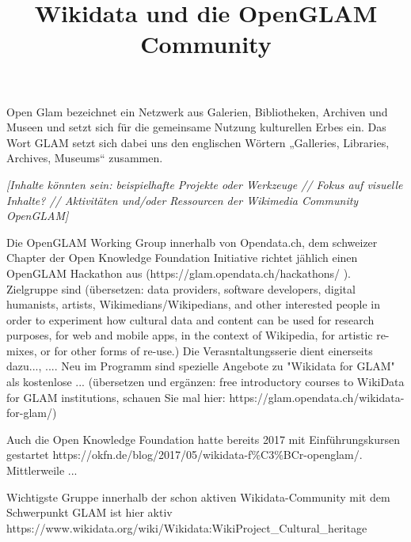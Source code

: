\documentclass{article}
\begin{document}
\title{Wikidata und die OpenGLAM Community}

\maketitle


Open Glam bezeichnet ein Netzwerk aus Galerien, Bibliotheken, Archiven und Museen und setzt sich für die gemeinsame Nutzung kulturellen Erbes ein. Das Wort GLAM setzt sich dabei uns den englischen Wörtern „Galleries, Libraries, Archives, Museums“ zusammen. \autocite{FidusWriter}


\emph{[Inhalte könnten sein: beispielhafte Projekte oder Werkzeuge // Fokus auf visuelle Inhalte? // Aktivitäten und/oder Ressourcen der Wikimedia Community OpenGLAM]}


Die OpenGLAM Working Group innerhalb von Opendata.ch, dem schweizer Chapter der Open Knowledge Foundation Initiative richtet jählich einen OpenGLAM Hackathon aus (https://glam.opendata.ch/hackathons/ ). Zielgruppe sind (übersetzen: data providers, software developers, digital humanists, artists, Wikimedians/Wikipedians, and other interested people in order to experiment how cultural data and content can be used for research purposes, for web and mobile apps, in the context of Wikipedia, for artistic re-mixes, or for other forms of re-use.)  Die Verasntaltungsserie dient einerseits dazu..., .... Neu im Programm sind spezielle Angebote zu "Wikidata for GLAM" als kostenlose ... (übersetzen und ergänzen: free introductory courses to WikiData for GLAM institutions, schauen Sie mal hier: https://glam.opendata.ch/wikidata-for-glam/)


Auch die Open Knowledge Foundation hatte bereits 2017 mit Einführungskursen gestartet https://okfn.de/blog/2017/05/wikidata-f\%C3\%BCr-openglam/. Mittlerweile ...


Wichtigste Gruppe innerhalb der schon aktiven Wikidata-Community mit dem Schwerpunkt GLAM ist hier aktiv https://www.wikidata.org/wiki/Wikidata:WikiProject\_Cultural\_heritage


\printbibliography[title={Literaturverzeichnis}]
\end{document}
